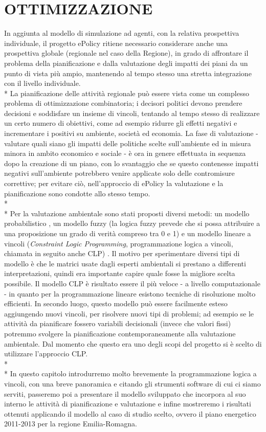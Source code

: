 \documentclass[12pt,a4paper,openright,twoside]{report}
\begin{document}
\chapter{\nohyphens{OTTIMIZZAZIONE}}
In aggiunta al modello di simulazione ad agenti, con la relativa prospettiva individuale, il progetto ePolicy ritiene necessario considerare anche una prospettiva globale (regionale nel caso della Regione), in grado di affrontare il problema della pianificazione e dalla valutazione degli impatti dei piani da un punto di vista più ampio, mantenendo al tempo stesso una stretta integrazione con il livello individuale.\\*
La pianificazione delle attività regionale può essere vista come un complesso problema di ottimizzazione combinatoria; i decisori politici devono prendere decisioni e soddisfare un insieme di vincoli, tentando al tempo stesso di realizzare un certo numero di obiettivi, come ad esempio ridurre gli effetti negativi e incrementare i positivi su ambiente, società ed economia. La fase di valutazione - valutare quali siano gli impatti delle politiche scelte sull'ambiente ed in misura minora in ambito economico e sociale - è ora in genere effettuata in sequenza dopo la creazione di un piano, con lo svantaggio che se questo contenesse impatti negativi sull'ambiente potrebbero venire applicate solo delle contromisure correttive; per evitare ciò, nell'approccio di ePolicy la valutazione e la pianificazione sono condotte allo stesso tempo.\\*\\*
Per la valutazione ambientale sono stati proposti diversi metodi: un modello probabilistico \cite{logicDSSstrategicAss}, un modello fuzzy (la logica fuzzy prevede che si possa attribuire a una proposizione un grado di verità compreso tra 0 e 1) \cite{fuzzyLogicstrategicAss} e un modello lineare a vincoli (\emph{Constraint Logic Programming}, programmazione logica a vincoli, chiamata in seguito anche CLP) \cite{GavanelliEtAl}. Il motivo per sperimentare diversi tipi di modello è che le matrici usate dagli esperti ambientali si prestano a differenti interpretazioni, quindi era importante capire quale fosse la migliore scelta possibile. Il modello CLP è risultato essere il più veloce - a livello computazionale - in quanto per la programmazione lineare esistono tecniche di risoluzione molto efficienti. In secondo luogo, questo modello può essere facilmente esteso aggiungendo nuovi vincoli, per risolvere nuovi tipi di problemi; ad esempio se le attività da pianificare fossero variabili decisionali (invece che valori fissi) potremmo svolgere la pianificazione contemporaneamente alla valutazione ambientale. Dal momento che questo era uno degli scopi del progetto si è scelto di utilizzare l'approccio CLP.\\*\\*
In questo capitolo introdurremo molto brevemente la programmazione logica a vincoli, con una breve panoramica e citando gli strumenti software di cui ci siamo serviti, passeremo poi a presentare il modello sviluppato che incorpora al suo interno le attività di pianificazione e valutazione e infine mostreremo i risultati ottenuti applicando il modello al caso di studio scelto, ovvero il piano energetico 2011-2013 per la regione Emilia-Romagna.
\end{document}
